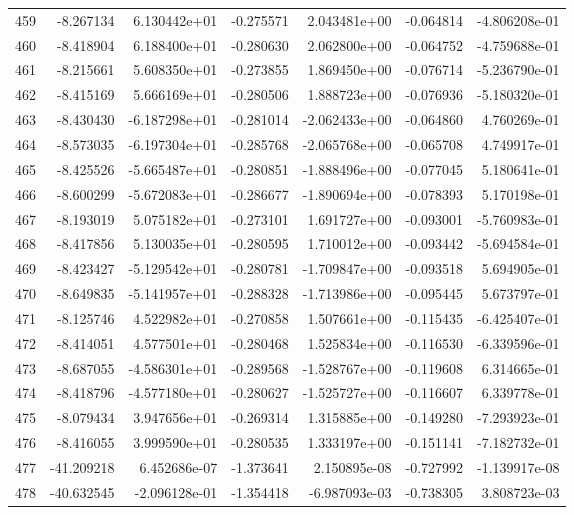 \begin{tabular}{rrrrrrr}
 459 &  -8.267134 &  6.130442e+01 & -0.275571 &  2.043481e+00 &  -0.064814 & -4.806208e-01 \\
 460 &  -8.418904 &  6.188400e+01 & -0.280630 &  2.062800e+00 &  -0.064752 & -4.759688e-01 \\
 461 &  -8.215661 &  5.608350e+01 & -0.273855 &  1.869450e+00 &  -0.076714 & -5.236790e-01 \\
 462 &  -8.415169 &  5.666169e+01 & -0.280506 &  1.888723e+00 &  -0.076936 & -5.180320e-01 \\
 463 &  -8.430430 & -6.187298e+01 & -0.281014 & -2.062433e+00 &  -0.064860 &  4.760269e-01 \\
 464 &  -8.573035 & -6.197304e+01 & -0.285768 & -2.065768e+00 &  -0.065708 &  4.749917e-01 \\
 465 &  -8.425526 & -5.665487e+01 & -0.280851 & -1.888496e+00 &  -0.077045 &  5.180641e-01 \\
 466 &  -8.600299 & -5.672083e+01 & -0.286677 & -1.890694e+00 &  -0.078393 &  5.170198e-01 \\
 467 &  -8.193019 &  5.075182e+01 & -0.273101 &  1.691727e+00 &  -0.093001 & -5.760983e-01 \\
 468 &  -8.417856 &  5.130035e+01 & -0.280595 &  1.710012e+00 &  -0.093442 & -5.694584e-01 \\
 469 &  -8.423427 & -5.129542e+01 & -0.280781 & -1.709847e+00 &  -0.093518 &  5.694905e-01 \\
 470 &  -8.649835 & -5.141957e+01 & -0.288328 & -1.713986e+00 &  -0.095445 &  5.673797e-01 \\
 471 &  -8.125746 &  4.522982e+01 & -0.270858 &  1.507661e+00 &  -0.115435 & -6.425407e-01 \\
 472 &  -8.414051 &  4.577501e+01 & -0.280468 &  1.525834e+00 &  -0.116530 & -6.339596e-01 \\
 473 &  -8.687055 & -4.586301e+01 & -0.289568 & -1.528767e+00 &  -0.119608 &  6.314665e-01 \\
 474 &  -8.418796 & -4.577180e+01 & -0.280627 & -1.525727e+00 &  -0.116607 &  6.339778e-01 \\
 475 &  -8.079434 &  3.947656e+01 & -0.269314 &  1.315885e+00 &  -0.149280 & -7.293923e-01 \\
 476 &  -8.416055 &  3.999590e+01 & -0.280535 &  1.333197e+00 &  -0.151141 & -7.182732e-01 \\
 477 & -41.209218 &  6.452686e-07 & -1.373641 &  2.150895e-08 &  -0.727992 & -1.139917e-08 \\
 478 & -40.632545 & -2.096128e-01 & -1.354418 & -6.987093e-03 &  -0.738305 &  3.808723e-03 \\

\end{tabular}
